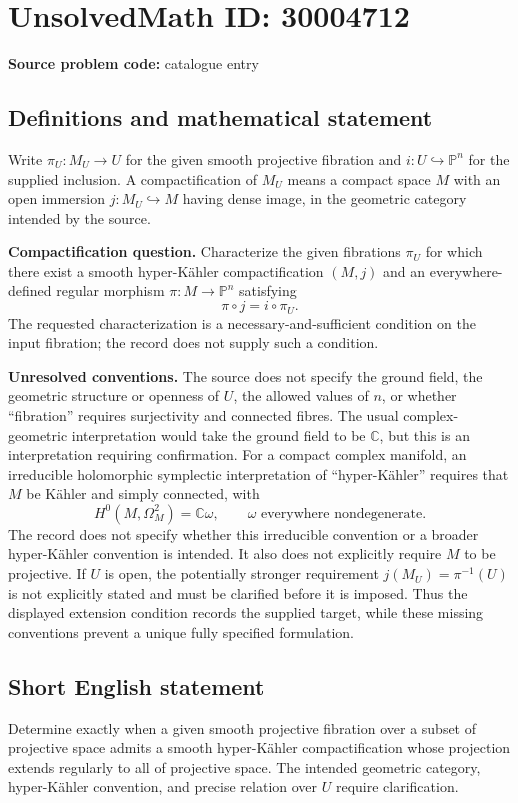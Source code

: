 \documentclass[11pt]{article}
\newcommand{\C}{\mathbb{C}}
\begin{document}
\section*{UnsolvedMath ID: 30004712}
\textbf{Source problem code:} catalogue entry
\subsection{Definitions and mathematical statement}
Write \(\pi_U:M_U\to U\) for the given smooth projective fibration and \(i:U\hookrightarrow\mathbb{P}^n\) for the supplied inclusion. A compactification of \(M_U\) means a compact space \(M\) with an open immersion \(j:M_U\hookrightarrow M\) having dense image, in the geometric category intended by the source.

\textbf{Compactification question.} Characterize the given fibrations \(\pi_U\) for which there exist a smooth hyper-Kähler compactification \((M,j)\) and an everywhere-defined regular morphism \(\pi:M\to\mathbb{P}^n\) satisfying
\[
\pi\circ j=i\circ\pi_U.
\]
The requested characterization is a necessary-and-sufficient condition on the input fibration; the record does not supply such a condition.

\textbf{Unresolved conventions.} The source does not specify the ground field, the geometric structure or openness of \(U\), the allowed values of \(n\), or whether ``fibration'' requires surjectivity and connected fibres. The usual complex-geometric interpretation would take the ground field to be \(\C\), but this is an interpretation requiring confirmation. For a compact complex manifold, an irreducible holomorphic symplectic interpretation of ``hyper-Kähler'' requires that \(M\) be Kähler and simply connected, with
\[
H^0(M,\Omega_M^2)=\C\omega,
\qquad
\omega\text{ everywhere nondegenerate}.
\]
The record does not specify whether this irreducible convention or a broader hyper-Kähler convention is intended. It also does not explicitly require \(M\) to be projective. If \(U\) is open, the potentially stronger requirement \(j(M_U)=\pi^{-1}(U)\) is not explicitly stated and must be clarified before it is imposed. Thus the displayed extension condition records the supplied target, while these missing conventions prevent a unique fully specified formulation.
\subsection{Short English statement}
Determine exactly when a given smooth projective fibration over a subset of projective space admits a smooth hyper-Kähler compactification whose projection extends regularly to all of projective space. The intended geometric category, hyper-Kähler convention, and precise relation over \(U\) require clarification.
\end{document}
